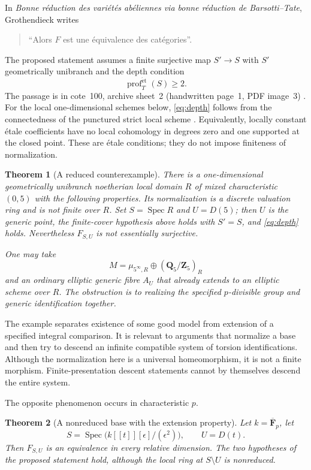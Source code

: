 \documentclass[11pt]{article}
\newtheorem{theorem}{Theorem}[section]
\theoremstyle{remark}\newtheorem{remark}[theorem]{Remark}
\newcommand{\Spec}{\operatorname{Spec}}
\newcommand{\et}{\mathrm{\acute et}}
\begin{document}
In \emph{Bonne r\'eduction des vari\'et\'es ab\'eliennes via bonne r\'eduction de Barsotti--Tate}, Grothendieck writes
\begin{quote}
``Alors $F$ est une \'equivalence des cat\'egories''.
\end{quote}
The proposed statement assumes a finite surjective map $S'\to S$ with $S'$ geometrically unibranch and the depth condition
\begin{equation}\label{eq:depth}
 \operatorname{prof}^{\et}_T(S)\geq2.
\end{equation}
The passage is in cote~100, archive sheet~2 (handwritten page~1, PDF image~3) \citep{GrothendieckNotes}. For the local one-dimensional schemes below, \eqref{eq:depth} follows from the connectedness of the punctured strict local scheme \citep[Expos\'e~XIV, Remark~1.6(b), p.~164]{SGA2}. Equivalently, locally constant \'etale coefficients have no local cohomology in degrees zero and one supported at the closed point. These are \'etale conditions; they do not impose finiteness of normalization.

\begin{theorem}[A reduced counterexample]\label{thm:reduced}
There is a one-dimensional geometrically unibranch noetherian local domain $R$ of mixed characteristic $(0,5)$ with the following properties. Its normalization is a discrete valuation ring and is not finite over $R$. Set $S=\Spec R$ and $U=D(5)$; then $U$ is the generic point, the finite-cover hypothesis above holds with $S'=S$, and \eqref{eq:depth} holds. Nevertheless $F_{S,U}$ is not essentially surjective.

One may take
\[
 M=\mu_{5^\infty,R}\oplus(\mathbf Q_5/\mathbf Z_5)_R
\]
and an ordinary elliptic generic fibre $A_U$ that already extends to an elliptic scheme over $R$. The obstruction is to realizing the specified $p$-divisible group and generic identification together.
\end{theorem}

The example separates existence of some good model from extension of a specified integral comparison. It is relevant to arguments that normalize a base and then try to descend an infinite compatible system of torsion identifications. Although the normalization here is a universal homeomorphism, it is not a finite morphism. Finite-presentation descent statements cannot by themselves descend the entire system.

The opposite phenomenon occurs in characteristic $p$.

\begin{theorem}[A nonreduced base with the extension property]\label{thm:positive}
Let $k=\overline{\mathbf F}_p$, let
\[
 S=\Spec\bigl(k[[t]][\epsilon]/(\epsilon^2)\bigr),
 \qquad U=D(t).
\]
Then $F_{S,U}$ is an equivalence in every relative dimension. The two hypotheses of the proposed statement hold, although the local ring at $S\setminus U$ is nonreduced.
\end{theorem}
\end{document}
